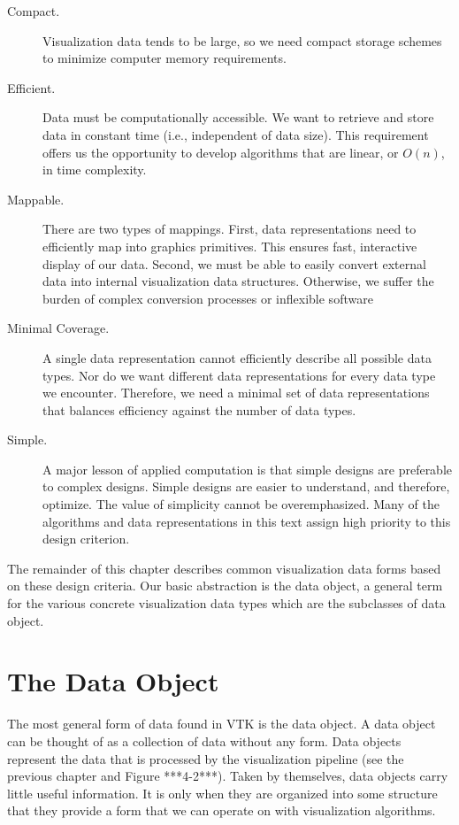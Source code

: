 \begin{description}

\item[Compact.] Visualization data tends to be large, so we need compact storage schemes to minimize computer memory requirements.

\item[Efficient.] Data must be computationally accessible. We want to retrieve and store data in constant time (i.e., independent of data size). This requirement offers us the opportunity to develop algorithms that are linear, or $O(n)$, in time complexity.

\item[Mappable.] There are two types of mappings. First, data representations need to efficiently map into graphics primitives. This ensures fast, interactive display of our data. Second, we must be able to easily convert external data into internal visualization data structures. Otherwise, we suffer the burden of complex conversion processes or inflexible software

\item[Minimal Coverage.] A single data representation cannot efficiently describe all possible data types. Nor do we want different data representations for every data type we encounter. Therefore, we need a minimal set of data representations that balances efficiency against the number of data types.

\item[Simple.] A major lesson of applied computation is that simple designs are preferable to complex designs. Simple designs are easier to understand, and therefore, optimize. The value of simplicity cannot be overemphasized. Many of the algorithms and data representations in this text assign high priority to this design criterion.

\end{description}

The remainder of this chapter describes common visualization data forms based on these design criteria. Our basic abstraction is the data object, a general term for the various concrete visualization data types which are the subclasses of data object. 

\section{The Data Object}

The most general form of data found in VTK is the data object. A data object can be thought of as a collection of data without any form. Data objects represent the data that is processed by the visualization pipeline (see the previous chapter and Figure ***4-2***). Taken by themselves, data objects carry little useful information. It is only when they are organized into some structure that they provide a form that we can operate on with visualization algorithms.

